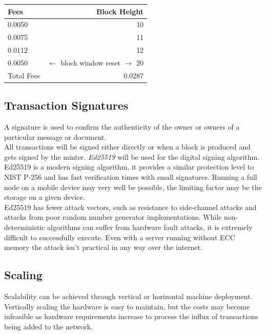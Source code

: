 \documentclass[12pt,a4paper]{article}
\begin{document}
  \vspace{3mm}
  \begin{tabular}{@{}lr@{}}
    Fees & Block Height     \\ \toprule
    0.0050 & 10             \\
    0.0075 & 11             \\
    0.0112 & 12             \\
    0.0050 & $\leftarrow{}$ block window reset $\rightarrow{}$ 20 \\ \midrule{}
    Total Fees & 0.0287     \\
    \bottomrule
  \end{tabular}

  \subsection{Transaction Signatures}
  A signature is used to confirm the authenticity of the owner or owners
  of a particular message or document.\\

  All transactions will be signed either directly or when a block is produced
  and gets signed by the minter. \textit{Ed25519}\cite{ed25519} will be used for
  the digital signing algorithm. Ed25519 is a modern signing algorithm, it
  provides a similar protection level to NIST P-256 and has fast verification
  times with small signatures. Running a full node on a mobile device may very
  well be possible, the limiting factor may be the storage on a given device.\\

  Ed25519 has fewer attack vectors, such as resistance to side-channel attacks
  and attacks from poor random number generator implementations. While
  non-deterministic algorithms can suffer from hardware fault attacks, it is
  extremely difficult to successfully execute. Even with a server running
  without ECC memory the attack isn't practical in any way over the
  internet.

  \subsection{Scaling}
  Scalability can be achieved through vertical or horizontal machine deployment.
  Vertically scaling the hardware is easy to maintain, but the costs may become
  infeasible as hardware requirements increase to process the influx of
  transactions being added to the network.\\
\end{document}
